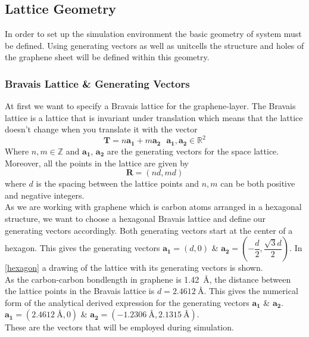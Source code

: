 
\subsection{Lattice Geometry}
In order to set up the simulation environment the basic geometry of system must be defined. Using generating vectors as well as unitcells the structure and holes of the graphene sheet will be defined within this geometry.
\subsubsection{Bravais Lattice \& Generating Vectors}\label{BLGV}
At first we want to specify a Bravais lattice for the graphene-layer. The Bravais lattice is a lattice that is invariant under translation which means that the lattice doesn't change when you translate it with the vector
\begin{equation}
 \mathbf{T}=n\mathbf{a_{1}}+m\mathbf{a_{2}}\ \ \ \mathbf{a_{1}},\mathbf{a_{2}} \in \mathbb{R}^{2}
\end{equation}
Where $n,m \in \mathbb{Z}$ and $\mathbf{a_{1}}$, $\mathbf{a_{2}}$ are the generating vectors for the space lattice. Moreover, all the points in the lattice are given by
\begin{equation}
 \mathbf{R}=(nd,md)
\end{equation}
where $d$ is the spacing between the lattice points and $n,m$ can be both positive and negative integers. \\
As we are working with graphene which is carbon atoms arranged in a hexagonal structure, we want to choose a hexagonal Bravais lattice and define our generating vectors accordingly. Both generating vectors start at the center of a hexagon. This gives the generating vectors $\mathbf{a_{1}}=(d,0)$ \& $\mathbf{a_{2}}=\left(-\dfrac{d}{2},\dfrac{\sqrt{3}d}{2}\right)$. In \cref{hexagon} a drawing of the lattice with its generating vectors is shown.\\
As the carbon-carbon bondlength in graphene is \SI{1.42}{\angstrom}, the distance between the lattice points  in the Bravais lattice is $d=\SI{2.4612}{\angstrom}$. This gives the numerical form of the analytical derived expression for the generating vectors  $\mathbf{a_{1}}$ \& $\mathbf{a_{2}}$. \\
$\mathbf{a_{1}}=(\SI{2.4612}{\angstrom},0)$ \& $\mathbf{a_{2}}=\left(-\SI{1.2306}{\angstrom},\SI{2.1315}{\angstrom}\right)$. \\These are the vectors that will be employed during simulation.
